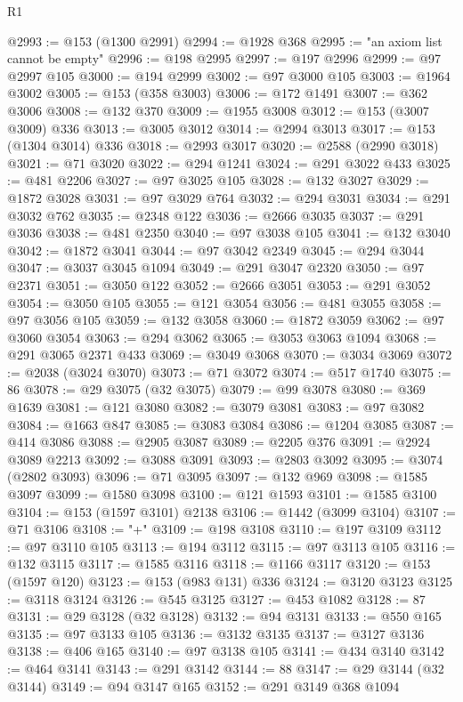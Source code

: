 \begin{lexlean}{R1}
\begin{coremodule}
@2993 := @153 (@1300 @2991)
@2994 := @1928 @368
@2995 := "an axiom list cannot be empty"
@2996 := @198 @2995
@2997 := @197 @2996
@2999 := @97 @2997 @105
@3000 := @194 @2999
@3002 := @97 @3000 @105
@3003 := @1964 @3002
@3005 := @153 (@358 @3003)
@3006 := @172 @1491
@3007 := @362 @3006
@3008 := @132 @370
@3009 := @1955 @3008
@3012 := @153 (@3007 @3009) @336
@3013 := @3005 @3012
@3014 := @2994 @3013
@3017 := @153 (@1304 @3014) @336
@3018 := @2993 @3017
@3020 := @2588 (@2990 @3018)
@3021 := @71 @3020
@3022 := @294 @1241
@3024 := @291 @3022 @433
@3025 := @481 @2206
@3027 := @97 @3025 @105
@3028 := @132 @3027
@3029 := @1872 @3028
@3031 := @97 @3029 @764
@3032 := @294 @3031
@3034 := @291 @3032 @762
@3035 := @2348 @122
@3036 := @2666 @3035
@3037 := @291 @3036
@3038 := @481 @2350
@3040 := @97 @3038 @105
@3041 := @132 @3040
@3042 := @1872 @3041
@3044 := @97 @3042 @2349
@3045 := @294 @3044
@3047 := @3037 @3045 @1094
@3049 := @291 @3047 @2320
@3050 := @97 @2371
@3051 := @3050 @122
@3052 := @2666 @3051
@3053 := @291 @3052
@3054 := @3050 @105
@3055 := @121 @3054
@3056 := @481 @3055
@3058 := @97 @3056 @105
@3059 := @132 @3058
@3060 := @1872 @3059
@3062 := @97 @3060 @3054
@3063 := @294 @3062
@3065 := @3053 @3063 @1094
@3068 := @291 @3065 @2371 @433
@3069 := @3049 @3068
@3070 := @3034 @3069
@3072 := @2038 (@3024 @3070)
@3073 := @71 @3072
@3074 := @517 @1740
@3075 := 86
@3078 := @29 @3075 (@32 @3075)
@3079 := @99 @3078
@3080 := @369 @1639
@3081 := @121 @3080
@3082 := @3079 @3081
@3083 := @97 @3082
@3084 := @1663 @847
@3085 := @3083 @3084
@3086 := @1204 @3085
@3087 := @414 @3086
@3088 := @2905 @3087
@3089 := @2205 @376
@3091 := @2924 @3089 @2213
@3092 := @3088 @3091
@3093 := @2803 @3092
@3095 := @3074 (@2802 @3093)
@3096 := @71 @3095
@3097 := @132 @969
@3098 := @1585 @3097
@3099 := @1580 @3098
@3100 := @121 @1593
@3101 := @1585 @3100
@3104 := @153 (@1597 @3101) @2138
@3106 := @1442 (@3099 @3104)
@3107 := @71 @3106
@3108 := "+"
@3109 := @198 @3108
@3110 := @197 @3109
@3112 := @97 @3110 @105
@3113 := @194 @3112
@3115 := @97 @3113 @105
@3116 := @132 @3115
@3117 := @1585 @3116
@3118 := @1166 @3117
@3120 := @153 (@1597 @120)
@3123 := @153 (@983 @131) @336
@3124 := @3120 @3123
@3125 := @3118 @3124
@3126 := @545 @3125
@3127 := @453 @1082
@3128 := 87
@3131 := @29 @3128 (@32 @3128)
@3132 := @94 @3131
@3133 := @550 @165
@3135 := @97 @3133 @105
@3136 := @3132 @3135
@3137 := @3127 @3136
@3138 := @406 @165
@3140 := @97 @3138 @105
@3141 := @434 @3140
@3142 := @464 @3141
@3143 := @291 @3142
@3144 := 88
@3147 := @29 @3144 (@32 @3144)
@3149 := @94 @3147 @165
@3152 := @291 @3149 @368 @1094

\end{coremodule}
\end{lexlean}
